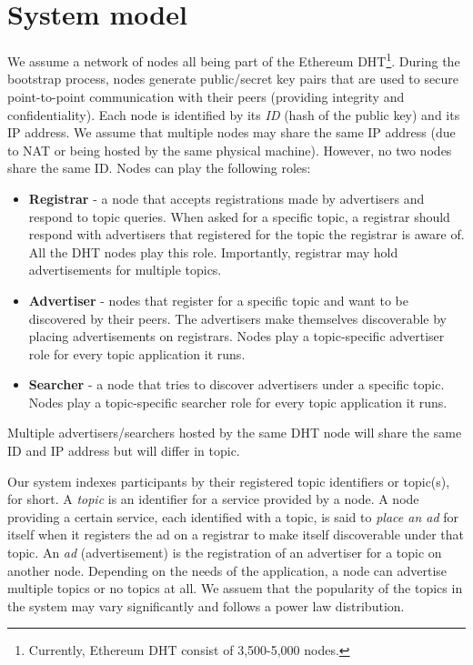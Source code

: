 
\section{System model}
We assume a network of nodes all being part of the Ethereum DHT\footnote{Currently, Ethereum DHT consist of 3,500-5,000 nodes.}. During the bootstrap process, nodes generate public/secret key pairs that are used to secure point-to-point communication with their peers (providing integrity and confidentiality). Each node is identified by its \emph{ID} (hash of the public key) and its IP address. We assume that multiple nodes may share the same IP address (due to NAT or being hosted by the same physical machine). However, no two nodes share the same ID. Nodes can play the following roles:
\begin{itemize}
    \item \textbf{Registrar} - a node that accepts registrations made by advertisers and respond to topic queries. When asked for a specific topic, a registrar should respond with advertisers that registered for the topic the registrar is aware of. All the DHT nodes play this role. Importantly, registrar may hold advertisements for multiple topics. 
    \item \textbf{Advertiser} - nodes that register for a specific topic and want to be discovered by their peers. The advertisers make themselves discoverable by placing advertisements on registrars. Nodes play a topic-specific advertiser role for every topic application it runs.
    \item \textbf{Searcher} - a node that tries to discover advertisers under a specific topic. Nodes play a topic-specific searcher role for every topic application it runs.
\end{itemize}
Multiple advertisers/searchers hosted by the same DHT node will share the same ID and IP address but will differ in topic. 

Our system indexes participants by their registered topic identifiers or topic(s), for short. A \emph{topic} is an identifier for a service provided by a node. A node providing a certain service, each identified with a topic, is said to \emph{place an ad} for itself when it registers the ad on a registrar to make itself discoverable under that topic. An \emph{ad} (\ie advertisement) is the registration of an advertiser for a topic on another node. Depending on the needs of the application, a node can advertise multiple topics or no topics at all. We assuem that the popularity of the topics in the system may vary significantly and follows a power law distribution. 


